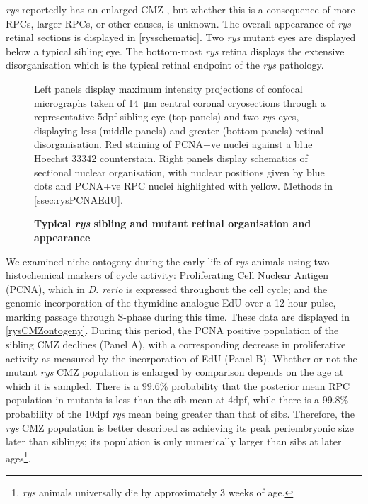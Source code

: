 \textit{rys} reportedly has an enlarged CMZ \cite{Wehman2005}, but whether this is a consequence of more RPCs, larger RPCs, or other causes, is unknown. The overall appearance of \textit{rys} retinal sections is displayed in \autoref{rysschematic}. Two \textit{rys} mutant eyes are displayed below a typical sibling eye. The bottom-most \textit{rys} retina displays the extensive disorganisation which is the typical retinal endpoint of the \textit{rys} pathology.

\begin{figure}[!h]
    \caption{{\bf Typical \textit{rys} sibling and mutant retinal organisation and appearance}}
    Left panels display maximum intensity projections of confocal micrographs taken of \SI{14}{\micro\metre} central coronal cryosections through a representative 5dpf sibling eye (top panels) and two \textit{rys} eyes, displaying less (middle panels) and greater (bottom panels) retinal disorganisation. Red staining of PCNA+ve nuclei against a blue Hoechst 33342 counterstain. Right panels display schematics of sectional nuclear organisation, with nuclear positions given by blue dots and PCNA+ve RPC nuclei highlighted with yellow.
    \label{rysschematic}
    Methods in \autoref{ssec:rysPCNAEdU}.
\end{figure}
\FloatBarrier

We examined niche ontogeny during the early life of \textit{rys} animals using two histochemical markers of cycle activity: Proliferating Cell Nuclear Antigen (PCNA), which in \textit{D. rerio} is expressed throughout the cell cycle; and the genomic incorporation of the thymidine analogue EdU over a 12 hour pulse, marking passage through S-phase during this time. These data are displayed in \autoref{rysCMZontogeny}. During this period, the PCNA positive population of the sibling CMZ declines (Panel A), with a corresponding decrease in proliferative activity as measured by the incorporation of EdU (Panel B). Whether or not the mutant \textit{rys} CMZ population is enlarged by comparison depends on the age at which it is sampled. There is a 99.6\% probability that the posterior mean RPC population in mutants is less than the sib mean at 4dpf, while there is a 99.8\% probability of the 10dpf \textit{rys} mean being greater than that of sibs. Therefore, the \textit{rys} CMZ population is better described as achieving its peak periembryonic size later than siblings; its population is only numerically larger than sibs at later ages\footnote{\textit{rys} animals universally die by approximately 3 weeks of age.}. 

